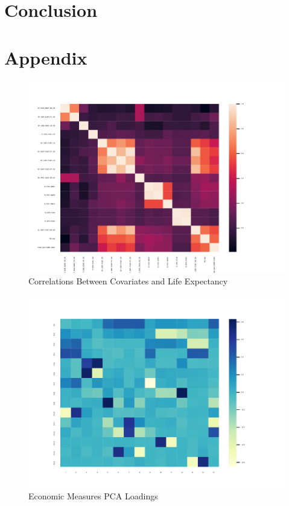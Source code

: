 \documentclass[12pt]{article}
\begin{document}
        

    \section*{Conclusion}

    \clearpage \newpage

    \appendix

    \section*{Appendix}

        \begin{figure}[h!]
            \centering
            \caption{Correlations Between Covariates and Life Expectancy}
            \label{LE_Health_Econ_Correlations}	
            \includegraphics[width=\linewidth,keepaspectratio=true]{../Output/Figures/LE_Health_Econ_Correlations.pdf}
        \end{figure}

        \begin{figure}[h!]
            \centering
            \caption{Economic Measures PCA Loadings}
            \label{Econ_Loadings}	
            \includegraphics[width=\linewidth,keepaspectratio=true]{../Output/Figures/Econ_Indicator_Loadings.pdf}
        \end{figure}
\end{document}
